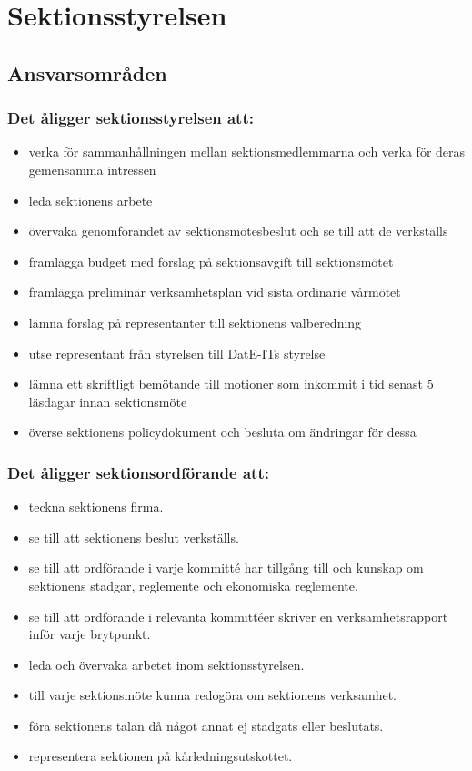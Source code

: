 \section{Sektionsstyrelsen}

\subsection{Ansvarsområden}

\subsubsection{Det åligger sektionsstyrelsen att:}

\begin{itemize}
  \item verka för sammanhållningen mellan sektionsmedlemmarna och verka för deras gemensamma intressen 
  \item leda sektionens arbete 
  \item övervaka genomförandet av sektionsmötesbeslut och se till att de verkställs 
  \item framlägga budget med förslag på sektionsavgift till sektionsmötet 
  \item framlägga preliminär verksamhetsplan vid sista ordinarie vårmötet 
  \item lämna förslag på representanter till sektionens valberedning 
  \item utse representant från styrelsen till DatE-ITs styrelse
  \item lämna ett skriftligt bemötande till motioner som inkommit i tid senast 5 läsdagar innan sektionsmöte
  \item överse sektionens policydokument och besluta om ändringar för dessa
\end{itemize}

\subsubsection{Det åligger sektionsordförande att:} 

\begin{itemize}
  \item teckna sektionens firma.
  \item se till att sektionens beslut verkställs.
  \item se till att ordförande i varje kommitté har tillgång till och kunskap om sektionens stadgar, reglemente och ekonomiska reglemente.
  \item se till att ordförande i relevanta kommittéer skriver en verksamhetsrapport inför varje brytpunkt.
  \item leda och övervaka arbetet inom sektionsstyrelsen.
  \item till varje sektionsmöte kunna redogöra om sektionens verksamhet.
  \item föra sektionens talan då något annat ej stadgats eller beslutats. 
  \item representera sektionen på kårledningsutskottet.
\end{itemize}

